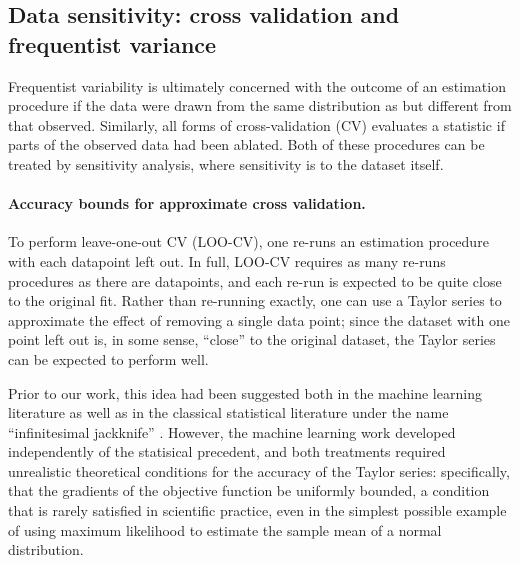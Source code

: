 

\subsection*{Data sensitivity: cross validation and frequentist variance}

Frequentist variability is ultimately concerned with the outcome of an
estimation procedure if the data were drawn from the same distribution as but
different from that observed.  Similarly, all forms of cross-validation (CV)
evaluates a statistic if parts of the observed data had been ablated.  Both of
these procedures can be treated by sensitivity analysis, where sensitivity
is to the dataset itself.

\paragraph{Accuracy bounds for approximate cross validation.}

To perform leave-one-out CV (LOO-CV), one re-runs an estimation procedure with
each datapoint left out.  In full, LOO-CV requires as many re-runs procedures as
there are datapoints, and each re-run is expected to be quite close to the
original fit.  Rather than re-running exactly, one can use a Taylor series to
approximate the effect of removing a single data point; since the dataset with
one point left out is, in some sense, ``close'' to the original dataset, the
Taylor series can be expected to perform well.

Prior to our work, this idea had been suggested both in the machine learning
literature \citep{rad:2018:scalableloo, koh:2017:blackbox} as well as in the
classical statistical literature under the name ``infinitesimal jackknife''
\citep{jaeckel:1972:infinitesimal, shao:2012:jackknife}.  However, the machine
learning work developed independently of the statisical precedent, and both
treatments required unrealistic theoretical conditions for the accuracy of the
Taylor series: specifically, that the gradients of the objective function be
uniformly bounded, a condition that is rarely satisfied in scientific practice,
even in the simplest possible example of using maximum likelihood to estimate
the sample mean of a normal distribution.

